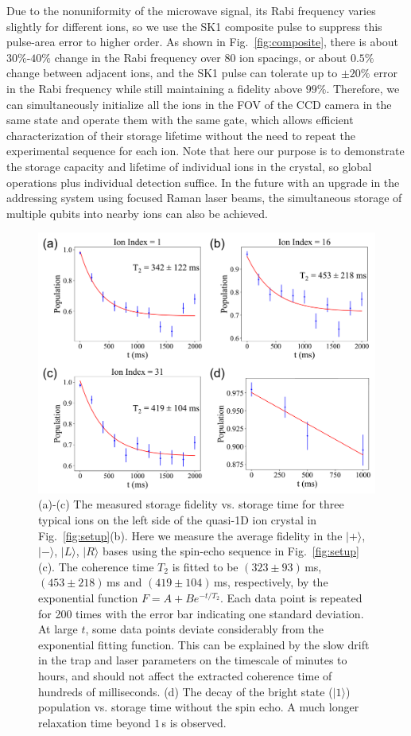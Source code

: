 \documentclass[aps,prl,reprint,superscriptaddress,twocolumn,longbibliography]{revtex4-1}
\begin{document}
Due to the nonuniformity of the microwave signal, its Rabi frequency varies slightly for different ions, so we use the SK1 composite pulse \cite{PhysRevA.70.052318,doi:10.7566/JPSJ.82.014004} to suppress this pulse-area error to higher order. As shown in Fig.~\ref{fig:composite}, there is about $30\%$-$40\%$ change in the Rabi frequency over 80 ion spacings, or about $0.5\%$ change between adjacent ions, and the SK1 pulse can tolerate up to $\pm20\%$ error in the Rabi frequency while still maintaining a fidelity above $99\%$. Therefore, we can simultaneously initialize all the ions in the FOV of the CCD camera in the same state and operate them with the same gate, which allows efficient characterization of their storage lifetime without the need to repeat the experimental sequence for each ion. Note that here our purpose is to demonstrate the storage capacity and lifetime of individual ions in the crystal, so global operations plus individual detection suffice. In the future with an upgrade in the addressing system using focused Raman laser beams, the simultaneous storage of multiple qubits into nearby ions can also be achieved.

\begin{figure}[!tbp]
  \centering
  \includegraphics[width=\linewidth]{Fig3.pdf}
  \caption{(a)-(c) The measured storage fidelity vs. storage time for three typical ions on the left side of the quasi-1D ion crystal in Fig.~\ref{fig:setup}(b). Here we measure the average fidelity in the $|+\rangle$, $|-\rangle$, $|L\rangle$, $|R\rangle$ bases using the spin-echo sequence in Fig.~\ref{fig:setup}(c). The coherence time $T_2$ is fitted to be $(323\pm 93)\,$ms, $(453\pm218)\,$ms and $(419\pm104)\,$ms, respectively, by the exponential function $F=A+Be^{-t/T_2}$. Each data point is repeated for 200 times with the error bar indicating one standard deviation. At large $t$, some data points deviate considerably from the exponential fitting function. This can be explained by the slow drift in the trap and laser parameters on the timescale of minutes to hours, and should not affect the extracted coherence time of hundreds of milliseconds. (d) The decay of the bright state ($|1\rangle$) population vs. storage time without the spin echo. A much longer relaxation time beyond $1\,$s is observed.}\label{fig:storage}
\end{figure}
\end{document}
